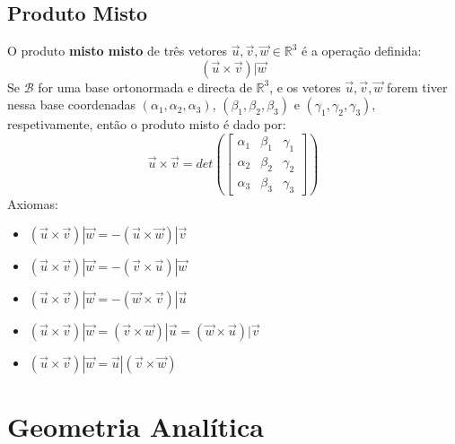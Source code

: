 \documentclass[]{report}
\begin{document}
\section{Produto Misto}
O produto \textbf{misto misto} de três vetores $\vec u, \vec v, \vec w \in \mathbb{R}^3$ é a operação definida:
$$(\vec u \times \vec v) | \vec w$$
Se $\mathcal{B}$ for uma base ortonormada e directa de $\mathbb{R}^3$, e os vetores $\vec u, \vec v, \vec w$ forem tiver nessa base coordenadas $(\alpha_1, \alpha_2, \alpha_3)$, 
$(\beta_1, \beta_2, \beta_3)$ e $(\gamma_1, \gamma_2, \gamma_3)$, respetivamente, então o produto misto é dado por:
$$\vec u \times \vec v = det\left(
\begin{bmatrix}
\alpha_1 & \beta_1 & \gamma_1\\
\alpha_2 & \beta_2 & \gamma_2\\
\alpha_3 & \beta_3 & \gamma_3
\end{bmatrix}
\right)$$
Axiomas:
\begin{itemize}
\item $(\vec u \times \vec v)|\vec w = -(\vec u \times \vec w)|\vec v$
\item $(\vec u \times \vec v)|\vec w = -(\vec v \times \vec u)|\vec w$
\item $(\vec u \times \vec v)|\vec w = -(\vec w \times \vec v)|\vec u$
\item $(\vec u \times \vec v)|\vec w = (\vec v \times \vec w)|\vec u = (\vec w \times \vec u)|\vec v$
\item $(\vec u \times \vec v)|\vec w = \vec u|(\vec v \times \vec w)$
\end{itemize}
\chapter{Geometria Analítica}
\end{document}
